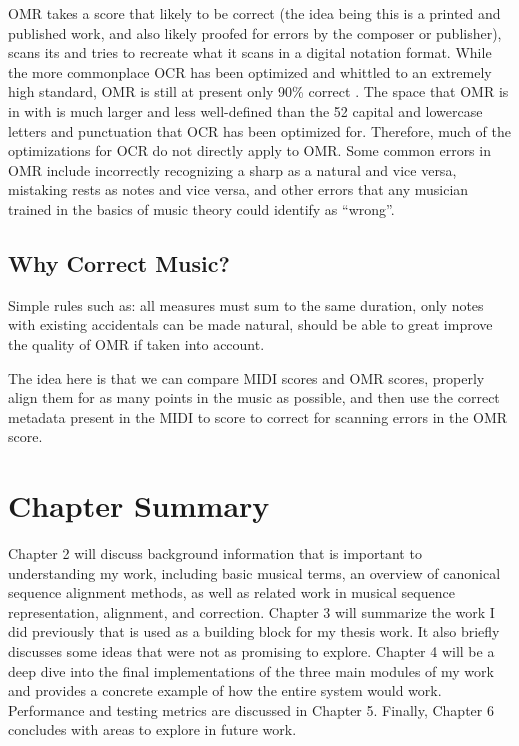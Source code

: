 OMR takes a score that likely to be correct (the idea being this is a printed and published work, and also likely proofed for errors by the composer or publisher), scans its and tries to recreate what it scans in a digital notation format. While the more commonplace OCR has been optimized and whittled to an extremely high standard, OMR is still at present only 90\% correct \cite{rebelo}. The space that OMR is in with is much larger and less well-defined than the 52 capital and lowercase letters and punctuation that OCR has been optimized for. Therefore, much of the optimizations for OCR do not directly apply to OMR. Some common errors in OMR include incorrectly recognizing a sharp as a natural and vice versa, mistaking rests as notes and vice versa, and other errors that any musician trained in the basics of music theory could identify as ``wrong''. 

\subsection{Why Correct Music?}

Simple rules such as: all measures must sum to the same duration, only notes with existing accidentals can be made natural, should be able to great improve the quality of OMR if taken into account.

The idea here is that we can compare MIDI scores and OMR scores, properly align them for as many points in the music as possible, and then use the correct metadata present in the MIDI to score to correct for scanning errors in the OMR score. 

\section{Chapter Summary}
Chapter 2 will discuss background information that is important to understanding my work, including basic musical terms, an overview of canonical sequence alignment methods, as well as related work in musical sequence representation, alignment, and correction. Chapter 3 will summarize the work I did previously that is used as a building block for my thesis work. It also briefly discusses some ideas that were not as promising to explore. Chapter 4 will be a deep dive into the final implementations of the three main modules of my work and provides a concrete example of how the entire system would work. Performance and testing metrics are discussed in Chapter 5. Finally, Chapter 6 concludes with areas to explore in future work. 

